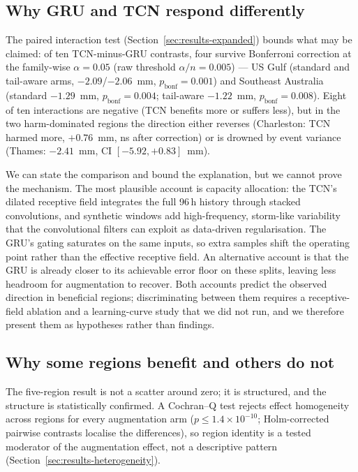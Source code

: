 \subsection{Why GRU and TCN respond differently}
\label{subsec:why-arch}

The paired interaction test (Section~\ref{sec:results-expanded}) bounds what
may be claimed: of ten TCN-minus-GRU contrasts, four survive Bonferroni
correction at the family-wise $\alpha=0.05$ (raw threshold
$\alpha/n=0.005$) --- US Gulf (standard and tail-aware arms,
$-2.09$/$-2.06$~mm, $p_{\text{bonf}} = 0.001$) and Southeast Australia
(standard $-1.29$~mm, $p_{\text{bonf}} = 0.004$; tail-aware $-1.22$~mm,
$p_{\text{bonf}} = 0.008$). Eight of ten
interactions are negative (TCN benefits more or suffers less), but in the two
harm-dominated regions the direction either reverses (Charleston: TCN harmed
more, $+0.76$~mm, ns after correction) or is drowned by event variance
(Thames: $-2.41$~mm, CI $[-5.92,+0.83]$~mm).

We can state the comparison and bound the explanation, but we cannot prove
the mechanism. The most plausible account is capacity allocation: the TCN's
dilated receptive field integrates the full 96\,h history through stacked
convolutions, and synthetic windows add high-frequency, storm-like
variability that the convolutional filters can exploit as data-driven
regularisation. The GRU's gating saturates on the same inputs, so extra
samples shift the operating point rather than the effective receptive field.
An alternative account is that the GRU is already closer to its achievable
error floor on these splits, leaving less headroom for augmentation to
recover. Both accounts predict the observed direction in beneficial regions;
discriminating between them requires a receptive-field ablation and a
learning-curve study that we did not run, and we therefore present them as
hypotheses rather than findings.

\subsection{Why some regions benefit and others do not}
\label{subsec:why-region}

The five-region result is not a scatter around zero; it is structured, and
the structure is statistically confirmed. A Cochran--Q test rejects effect
homogeneity across regions for every augmentation arm
($p \le 1.4\times10^{-10}$; Holm-corrected pairwise contrasts localise the
differences), so region identity is a tested moderator of the augmentation
effect, not a descriptive pattern
(Section~\ref{sec:results-heterogeneity}).

